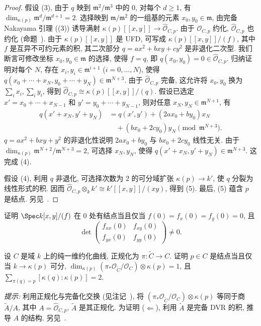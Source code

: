 \begin{proof}
假设 (3), 由于 $q$ 映到 $\mathfrak m^2/\mathfrak m^3$ 中的 $0$, 对每个 $d\geq1$, 有 $\dim_{\kappa(p)}\mathfrak m^d/\mathfrak m^{d+1}=2$. 选择映到 $\mathfrak m/\mathfrak m^2$ 的一组基的元素 $x_0,\allowbreak y_0\in\mathfrak m$, 由完备 Nakayama 引理 ((3)) 诱导满射 $\kappa(p)[[x,\allowbreak y]]\to\widehat{\mathcal O}_{C,\allowbreak p}$. 由于 $\mathcal O_{C,\allowbreak p}$ 约化, $\widehat{\mathcal O}_{C,\allowbreak p}$ 也约化 (命题~). 由于 $\kappa(p)[[x,\allowbreak y]]$ 是 UFD, 可写成 $\kappa(p)[[x,\allowbreak y]]/(f)$, 其中 $f$ 是互异不可约元素的积, 其二次部分 $q=ax^2+bxy+cy^2$ 是非退化二次型. 我们断言可修改坐标 $x_0,\allowbreak y_0\in\mathfrak m$ 的选择, 使得 $f=q$, 即 $q(x_0,\allowbreak y_0)=0\in\widehat{\mathcal O}_{C,\allowbreak p}$. 归纳证明对每个 $N$, 存在 $x_i,\allowbreak y_i\in\mathfrak m^{i+1}$ ($i=0,\allowbreak \ldots,\allowbreak N$), 使得 $q(x_0+\cdots+x_N,\allowbreak y_0+\cdots+y_N)\in\mathfrak m^{N+3}$. 由于 $\widehat{\mathcal O}_{C,\allowbreak p}$ 完备, 这允许将 $x_0,\allowbreak y_0$ 换为 $\sum_i x_i,\allowbreak \sum_i y_i$, 得到 $\widehat{\mathcal O}_{C,\allowbreak p}\cong\kappa(p)[[x,\allowbreak y]]/(q)$. 假设已选定 $x'=x_0+\cdots+x_{N-1}$ 和 $y'=y_0+\cdots+y_{N-1}$, 则对任意 $x_N,\allowbreak y_N\in\mathfrak m^{N+1}$, 有
\[
\begin{aligned}
q(x'+x_N,y'+y_N)&=q(x',y')+(2ax_0+by_0)x_N\\
&\quad +(bx_0+2cy_0)y_N\pmod{\mathfrak m^{N+3}}.
\end{aligned}
\]
$q=ax^2+bxy+y^2$ 的非退化性说明 $2ax_0+by_0$ 与 $bx_0+2cy_0$ 线性无关. 由于 $\dim_{\kappa(p)}\mathfrak m^{N+2}/\mathfrak m^{N+3}=2$, 可选择 $x_N,\allowbreak y_N$, 使得 $q(x'+x_N,\allowbreak y'+y_N)\in\mathfrak m^{N+3}$. 这完成 (4).

假设 (4), 利用 $q$ 非退化, 可选择次数为 $2$ 的可分域扩张 $\kappa(p)\to\allowbreak k'$, 使 $q$ 分裂为线性形式的积. 因而 $\widehat{\mathcal O}_{C,\allowbreak p}\otimes_k k'\cong k'[[x,\allowbreak y]]/(xy)$, 得到 (5). 最后, (5) 蕴含 $p$ 是结点. 另见~\cite[Tags 0C49, 0C4D 和 0C4E]{SP}.
\end{proof}
\begin{exercise}[容易]\label{src:6.2.5}
证明 $\Spec k[x,\allowbreak y]/(f)$ 在 $0$ 处有结点当且仅当 $f(0)=f_x(0)=f_y(0)=0$, 且
\[
\det\begin{pmatrix}f_{xx}(0)&f_{xy}(0)\\f_{yx}(0)&f_{yy}(0)\end{pmatrix}\neq0.
\]
\end{exercise}
\begin{exercise}[很好的练习]\label{src:6.2.6}
设 $C$ 是域 $k$ 上的纯一维约化曲线, 正规化为 $\pi:\widetilde C\to\allowbreak C$. 证明 $p\in C$ 是结点当且仅当 $k\to\kappa(p)$ 可分, $\dim_{\kappa(p)}(\pi_*\mathcal O_{\widetilde C}/\mathcal O_C)\otimes\kappa(p)=1$, 且 $\sum_{\pi(q)=p}[\kappa(q):\kappa(p)]=2$.

\textit{提示:} 利用正规化与完备化交换 (见注记~), 将 $(\pi_*\mathcal O_{\widetilde C}/\mathcal O_C)\otimes\kappa(p)$ 等同于商 $\widetilde A/A$, 其中 $A=\widehat{\mathcal O}_{C,\allowbreak p}$, $\widetilde A$ 是其正规化. 为证明 ($\Leftarrow$), 利用 $\widetilde A$ 是完备 DVR 的积, 推导 $A$ 的结构. 另见~\cite[Tag 0C4A]{SP}.
\end{exercise}
